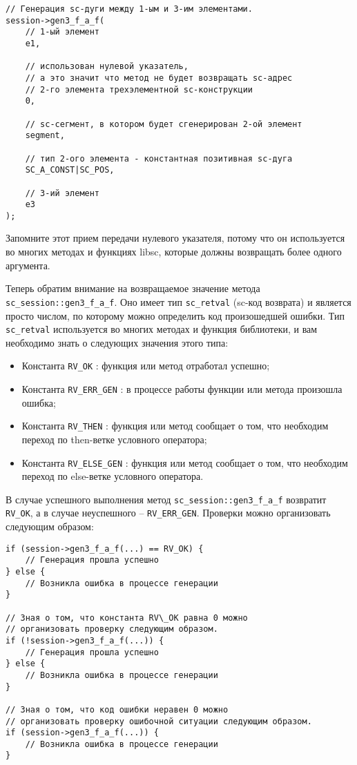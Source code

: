 \begin{lstlisting}[texcl]
// Генерация sc-дуги между 1-ым и 3-им элементами.
session->gen3_f_a_f(
    // 1-ый элемент
    e1,

    // использован нулевой указатель,
    // а это значит что метод не будет возвращать sc-адрес
    // 2-го элемента трехэлементной sc-конструкции
    0,

    // sc-сегмент, в котором будет сгенерирован 2-ой элемент
    segment,

    // тип 2-ого элемента - константная позитивная sc-дуга
    SC_A_CONST|SC_POS,

    // 3-ий элемент
    e3
);
\end{lstlisting}

Запомните этот прием передачи нулевого указателя, потому что он
используется во многих методах и функциях libsc, которые должны
возвращать более одного аргумента.

Теперь обратим внимание на возвращаемое значение метода
\lstinline|sc_session::gen3_f_a_f|. Оно имеет тип
\lstinline|sc_retval| (sc-код возврата) и является просто числом, по
которому можно определить код произошедшей ошибки. Тип
\lstinline|sc_retval| используется во многих методах и функция
библиотеки, и вам необходимо знать о следующих значения этого типа:


\begin{itemize}
\item Константа \lstinline|RV_OK| : функция или метод отработал
  успешно;
\item Константа \lstinline|RV_ERR_GEN| : в процессе работы функции или метода
  произошла ошибка;
\item Константа \lstinline|RV_THEN| : функция или метод сообщает о
  том, что необходим переход по then-ветке условного оператора;
\item Константа \lstinline|RV_ELSE_GEN| : функция или метод сообщает о
  том, что необходим переход по else-ветке условного оператора.
\end{itemize}

В случае успешного выполнения метод \lstinline|sc_session::gen3_f_a_f|
возвратит \lstinline|RV_OK|, а в случае неуспешного –
\lstinline|RV_ERR_GEN|. Проверки можно организовать следующим образом:
\begin{lstlisting}[texcl]
if (session->gen3_f_a_f(...) == RV_OK) {
    // Генерация прошла успешно
} else {
    // Возникла ошибка в процессе генерации
}

// Зная о том, что константа RV\_OK равна 0 можно
// организовать проверку следующим образом.
if (!session->gen3_f_a_f(...)) {
    // Генерация прошла успешно
} else {
    // Возникла ошибка в процессе генерации
}

// Зная о том, что код ошибки неравен 0 можно
// организовать проверку ошибочной ситуации следующим образом.
if (session->gen3_f_a_f(...)) {
    // Возникла ошибка в процессе генерации
}
\end{lstlisting}

